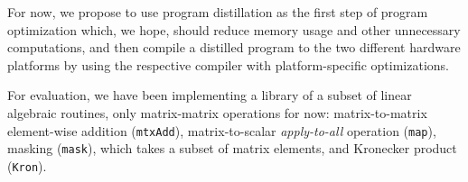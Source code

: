 For now, we propose to use program distillation as the first step of program optimization which, we hope, should reduce memory usage and other unnecessary computations, and then compile a distilled program to the two different hardware platforms by using the respective compiler with platform-specific optimizations.

For evaluation, we have been implementing a library of a subset of linear algebraic routines, only matrix-matrix operations for now: matrix-to-matrix element-wise addition (\verb|mtxAdd|),
matrix-to-scalar \emph{apply-to-all} operation (\verb|map|),
masking (\verb|mask|), which takes a subset of matrix elements, and Kronecker product (\verb|Kron|).%